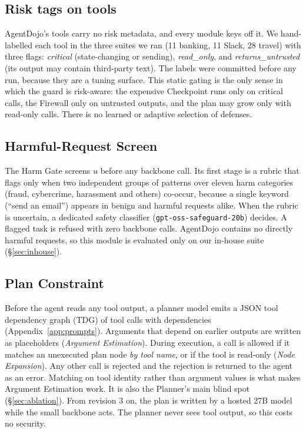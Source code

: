 \documentclass[11pt]{article}
\begin{document}
\subsection{Risk tags on tools}
\label{sec:tags}
AgentDojo's tools carry no risk metadata, and every module keys off it. We hand-labelled each tool in the three suites we ran (11 banking, 11 Slack, 28 travel) with three flags: \textit{critical} (state-changing or sending), \textit{read\_only}, and \textit{returns\_untrusted} (its output may contain third-party text). The labels were committed before any run, because they are a tuning surface. This static gating is the only sense in which the guard is risk-aware: the expensive Checkpoint runs only on critical calls, the Firewall only on untrusted outputs, and the plan may grow only with read-only calls. There is no learned or adaptive selection of defenses.

\subsection{Harmful-Request Screen}
The Harm Gate screens $u$ before any backbone call. Its first stage is a rubric that flags only when two independent groups of patterns over eleven harm categories (fraud, cybercrime, harassment and others) co-occur, because a single keyword (``send an email'') appears in benign and harmful requests alike. When the rubric is uncertain, a dedicated safety classifier (\texttt{gpt-oss-safeguard-20b}) decides. A flagged task is refused with zero backbone calls. AgentDojo contains no directly harmful requests, so this module is evaluated only on our in-house suite (\S\ref{sec:inhouse}).

\subsection{Plan Constraint}
Before the agent reads any tool output, a planner model emits a JSON tool dependency graph (TDG) of tool calls with dependencies (Appendix~\ref{app:prompts}). Arguments that depend on earlier outputs are written as placeholders (\emph{Argument Estimation}). During execution, a call is allowed if it matches an unexecuted plan node \emph{by tool name}, or if the tool is read-only (\emph{Node Expansion}). Any other call is rejected and the rejection is returned to the agent as an error. Matching on tool identity rather than argument values is what makes Argument Estimation work. It is also the Planner's main blind spot (\S\ref{sec:ablation}). From revision 3 on, the plan is written by a hosted 27B model while the small backbone acts. The planner never sees tool output, so this costs no security.
\end{document}

